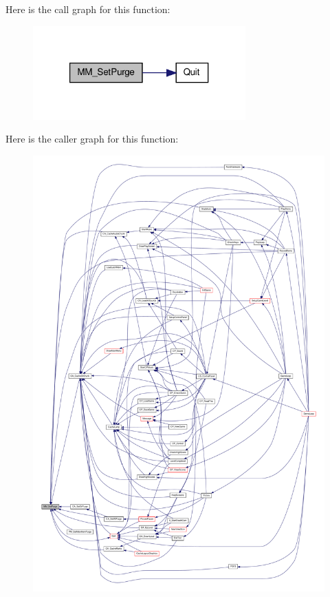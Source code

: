 Here is the call graph for this function:
\nopagebreak
\begin{figure}[H]
\begin{center}
\leavevmode
\includegraphics[width=232pt]{ID__MM_8H_a114de4a52bcc47e8d668ab78a7c702c9_cgraph}
\end{center}
\end{figure}




Here is the caller graph for this function:
\nopagebreak
\begin{figure}[H]
\begin{center}
\leavevmode
\includegraphics[width=400pt]{ID__MM_8H_a114de4a52bcc47e8d668ab78a7c702c9_icgraph}
\end{center}
\end{figure}


